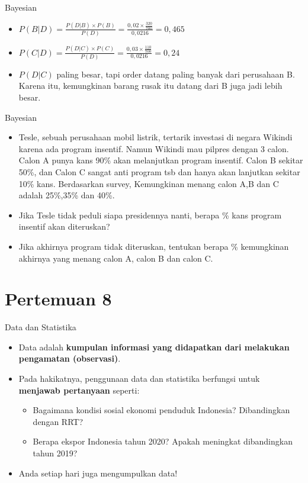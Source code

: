 \documentclass[
  ignorenonframetext,
]{beamer}
\begin{document}
\begin{frame}{Bayesian}
\label{bayesian-1}
\begin{itemize}
\item
  \(P(B|D)=\frac{P(D|B) \times P(B)}{P(D)}=\frac{0,02 \times \frac{320}{700}}{0,0216}=0,465\)
\item
  \(P(C|D)=\frac{P(D|C) \times P(C)}{P(D)}=\frac{0,03 \times \frac{110}{700}}{0,0216}=0,24\)
\item
  \(P(D|C)\) paling besar, tapi order datang paling banyak dari
  perusahaan B. Karena itu, kemungkinan barang rusak itu datang dari B
  juga jadi lebih besar.
\end{itemize}
\end{frame}

\begin{frame}{Bayesian}
\label{bayesian-2}
\begin{itemize}
\item
  Tesle, sebuah perusahaan mobil listrik, tertarik investasi di negara
  Wikindi karena ada program insentif. Namun Wikindi mau pilpres dengan
  3 calon. Calon A punya kans 90\% akan melanjutkan program insentif.
  Calon B sekitar 50\%, dan Calon C sangat anti program tsb dan hanya
  akan lanjutkan sekitar 10\% kans. Berdasarkan survey, Kemungkinan
  menang calon A,B dan C adalah 25\%,35\% dan 40\%.
\item
  Jika Tesle tidak peduli siapa presidennya nanti, berapa \% kans
  program insentif akan diteruskan?
\item
  Jika akhirnya program tidak diteruskan, tentukan berapa \% kemungkinan
  akhirnya yang menang calon A, calon B dan calon C.
\end{itemize}
\end{frame}

\section{Pertemuan 8}\label{pertemuan-8}

\begin{frame}{Data dan Statistika}
\label{data-dan-statistika}
\begin{itemize}
\item
  Data adalah \textbf{kumpulan informasi yang didapatkan dari melakukan
  pengamatan (observasi)}.
\item
  Pada hakikatnya, penggunaan data dan statistika berfungsi untuk
  \textbf{menjawab pertanyaan} seperti:

  \begin{itemize}
  \item
    Bagaimana kondisi sosial ekonomi penduduk Indonesia? Dibandingkan
    dengan RRT?
  \item
    Berapa ekspor Indonesia tahun 2020? Apakah meningkat dibandingkan
    tahun 2019?
  \end{itemize}
\item
  Anda setiap hari juga mengumpulkan data!
\end{itemize}
\end{frame}
\end{document}
